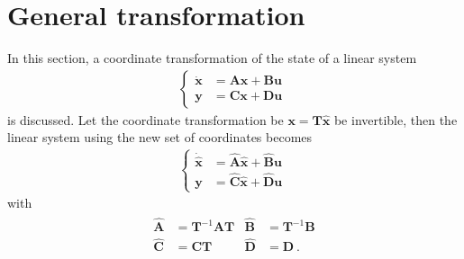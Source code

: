\documentclass[letterpaper,10pt,english]{jupyterBook}
\begin{document}
\section{General transformation}
\label{\detokenize{ch/system-theory/coordinate-transformation:general-transformation}}\label{\detokenize{ch/system-theory/coordinate-transformation:system-theory-coordinate-transformation-general}}
\sphinxAtStartPar
In this section, a coordinate transformation of the state of a linear system
\begin{equation*}
\begin{split}\left\{\begin{aligned}
  \dot{\mathbf{x}} & = \mathbf{A} \mathbf{x} + \mathbf{B} \mathbf{u} \\
       \mathbf{y}  & = \mathbf{C} \mathbf{x} + \mathbf{D} \mathbf{u} \
\end{aligned}\right.\end{split}
\end{equation*}
\sphinxAtStartPar
is discussed.
Let the coordinate transformation be \(\mathbf{x} = \mathbf{T} \hat{\mathbf{x}}\) be invertible, then the linear system using the new set of coordinates becomes
\begin{equation*}
\begin{split}\left\{\begin{aligned}
  \dot{\hat{\mathbf{x}}} & = \hat{\mathbf{A}} \hat{\mathbf{x}} + \hat{\mathbf{B}} \mathbf{u} \\
            \mathbf{y}   & = \hat{\mathbf{C}} \hat{\mathbf{x}} + \hat{\mathbf{D}} \mathbf{u} \
\end{aligned}\right.\end{split}
\end{equation*}
\sphinxAtStartPar
with
\begin{equation*}
\begin{split}\begin{aligned}
  \hat{\mathbf{A}} & = \mathbf{T}^{-1} \mathbf{A} \mathbf{T} & \hat{\mathbf{B}} & = \mathbf{T}^{-1} \mathbf{B} \\
  \hat{\mathbf{C}} & =                 \mathbf{C} \mathbf{T} & \hat{\mathbf{D}} & =                 \mathbf{D} \ .
\end{aligned}\end{split}
\end{equation*}
\end{document}
